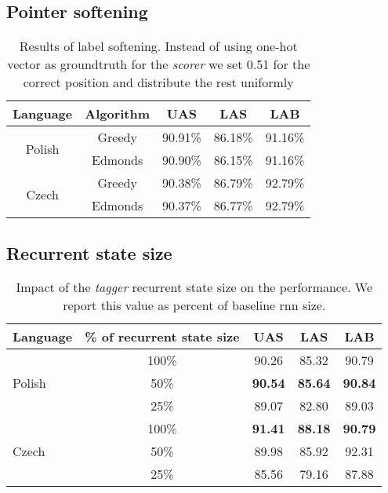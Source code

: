 \subsection{Pointer softening}
\begin{table}[!htbp]
    \centering
    \begin{tabular}{c c c c c}
        Language & Algorithm & UAS & LAS & LAB \\ \hline
        \multirow{2}{*}{Polish}& Greedy & 90.91\% & 86.18\% & 91.16\% \\
               & Edmonds & 90.90\% & 86.15\% & 91.16\% \\ \hline
        \multirow{2}{*}{Czech}& Greedy & 90.38\% & 86.79\% & 92.79\% \\
               & Edmonds & 90.37\% & 86.77\% & 92.79\% \\
    \end{tabular}
    \caption{Results of label softening. Instead of using one-hot vector as
    groundtruth for the \textit{scorer} we set
    0.51 for the correct position and distribute the rest uniformly}
    \label{tab:soften}
\end{table}


\subsection{Recurrent state size}
\begin{table}[!htbp]
    \centering
    \begin{tabular}{l c c c c}
        Language & \% of recurrent state size & UAS & LAS & LAB \\ \hline \hline
        \multirow{3}{*}{Polish}& 100\% & 90.26 & 85.32 & 90.79 \\
        & 50\% & \textbf{90.54} & \textbf{85.64} & \textbf{90.84} \\
        & 25\% & 89.07 & 82.80 & 89.03 \\ \hline
        \multirow{3}{*}{Czech}& 100\% & \textbf{91.41} & \textbf{88.18} & \textbf{90.79} \\
        & 50\% & 89.98 & 85.92 & 92.31\\
        & 25\% & 85.56 & 79.16 & 87.88\\ \hline%
    \end{tabular}
    \label{tab:birnn_single_size}
    \caption{Impact of the \emph{tagger} recurrent state size on the performance.
    We report this value as percent of baseline rnn size.}
\end{table}

